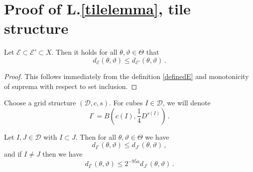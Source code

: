 \section{Proof of L.\ref{tilelemma}, tile structure}
\label{subsectiles}

\begin{lemma}
    \label{lem d monotone}
    Let $\mathcal{E} \subset \mathcal{E}' \subset X$. Then it holds for all $\theta, \vartheta \in \Theta$ that
    $$
        d_{\mathcal{E}}(\theta, \vartheta) \le d_{\mathcal{E}'}(\theta, \vartheta)\,.
    $$
\end{lemma}

\begin{proof}
    This follows immediately from the definition \eqref{definedE} and monotonicity of suprema with respect to set inclusion.
\end{proof}

Choose a grid structure $(\mathcal{D}, c, s)$. For cubes $I \in \mathcal{D}$, we will denote
$$
    I^\circ = B(c(I), \frac{1}{4} D^{s(I)})\,.
$$

\begin{lemma}
    \label{lem cube monotone}
    Let $I, J \in \mathcal{D}$ with $I \subset J$.
    Then for all $\theta, \vartheta \in\Theta$ we have
    $$
        d_{I^\circ}(\theta, \vartheta) \le d_{J^\circ}(\theta, \vartheta)\,,
    $$
    and if $I \ne J$ then we have
    $$
        d_{I^\circ}(\theta, \vartheta) \le 2^{-95a} d_{J^\circ}(\theta, \vartheta)\,.
    $$
\end{lemma}

